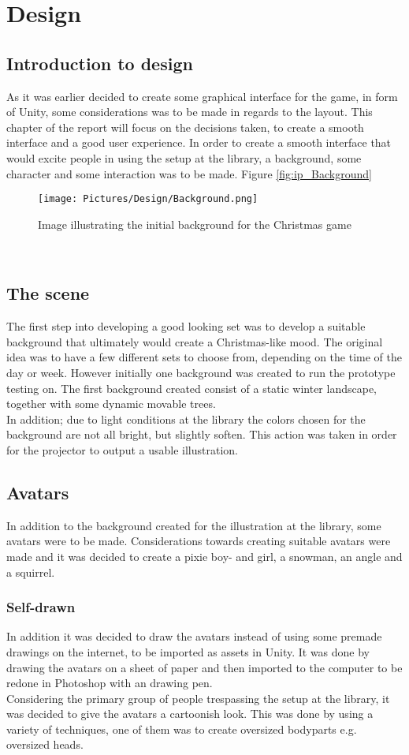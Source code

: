 
\chapter{Design}
\section{Introduction to design}
As it was earlier decided to create some graphical interface for the game, in form of Unity, some considerations was to be made in regards to the layout. This chapter of the report will focus on the decisions taken, to create a smooth interface and a good user experience. In order to create a smooth interface that would excite people in using the setup at the library, a background, some character and some interaction was to be made. Figure \eqref{fig:ip_Background}
\begin{figure}[htbp]
\centering
\texttt{[image: Pictures/Design/Background.png]}
\caption{Image illustrating the initial background for the Christmas game}
\label{fig:ip_Background}
\end{figure}\\ 
\section{The scene}
The first step into developing a good looking set was to develop a suitable background that ultimately would create a Christmas-like mood. The original idea was to have a few different sets to choose from, depending on the time of the day or week. However initially one background was created to run the prototype testing on. The first background created consist of a static winter landscape, together with some dynamic movable trees.\\
In addition; due to light conditions at the library the colors chosen for the background are not all bright, but slightly soften. This action was taken in order for the projector to output a usable illustration.
\section{Avatars}
In addition to the background created for the illustration at the library, some avatars were to be made. Considerations towards creating suitable avatars were made and it was decided to create a pixie boy- and girl, a snowman, an angle and a squirrel.
\subsection{Self-drawn}
In addition it was decided to draw the avatars instead of using some premade drawings on the internet, to be imported as assets in Unity. It was done by drawing the avatars on a sheet of paper and then imported to the computer to be redone in Photoshop with an drawing pen.\\
Considering the primary group of people trespassing the setup at the library, it was decided to give the avatars a cartoonish look. This was done by using a variety of techniques, one of them was to create oversized bodyparts e.g. oversized heads.

